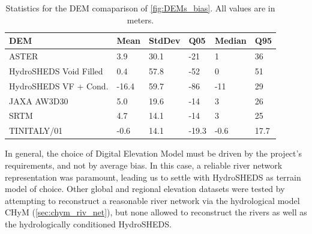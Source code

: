 \begin{table}[]
\centering
\begin{tabular}{@{}llllll@{}}
\toprule
DEM                     & Mean   & StdDev & Q05   & Median & Q95 \\ \midrule
ASTER                   & 3.9    & 30.1   & -21   & 1      & 36 \\
HydroSHEDS Void Filled  & 0.4    & 57.8   & -52   & 0      & 51 \\
HydroSHEDS VF + Cond.  & -16.4  & 59.7   & -86   & -11    & 29 \\
JAXA AW3D30             & 5.0    & 19.6   & -14   & 3      & 26 \\
SRTM                    & 4.7    & 14.1   & -14   & 3      & 25 \\
TINITALY/01              & -0.6   & 14.1   & -19.3 & -0.6   & 17.7   
\end{tabular}
\decoRule
\caption[Comparison of DEMs: bias metrics with PCN20]{Statistics for the DEM comaparison of \cref{fig:DEMs_bias}. All values are in meters.} \label{tab:DEMs_stats}
\end{table}

In general, the choice of Digital Elevation Model must be driven by the project's requirements, and not by average bias. In this case, a reliable river network representation was paramount, leading us to settle with HydroSHEDS as terrain model of choice. Other global and regional elevation datasets were tested by attempting to reconstruct a reasonable river network via the hydrological model CHyM (\cref{sec:chym_riv_net}), but none allowed to reconstruct the rivers as well as the hydrologically conditioned HydroSHEDS.
